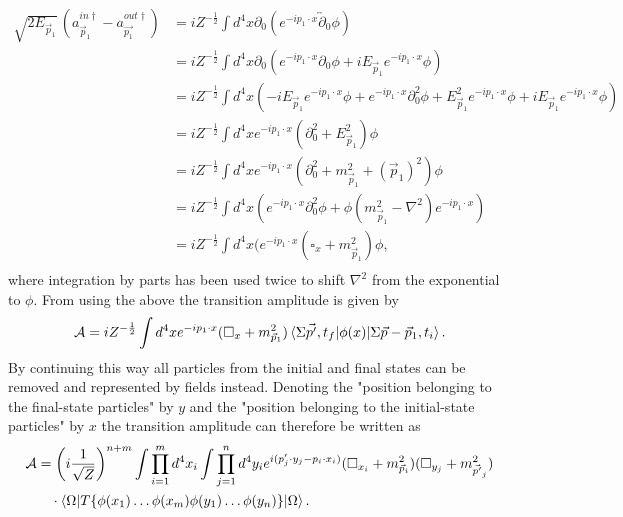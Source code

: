  \begin{equation}
	\begin{split}
		\sqrt{2E_{\vec{p}_1}}\,(a_{\vec{p}_1}^{in \dagger}-a_{\vec{p_1}}^{out\dagger})&=iZ^{-\frac{1}{2}}\int d^4x \partial_0(e^{-ip_1\cdot x}\overleftrightarrow{\partial}_0\phi)\\
		&=iZ^{-\frac{1}{2}}\int d^4x \partial_0(e^{-ip_1\cdot x}\partial_0\phi+iE_{\vec{p}_1}e^{-ip_1\cdot x}\phi)\\
		&=iZ^{-\frac{1}{2}}\int d^4x (-iE_{\vec{p}_1}e^{-ip_1\cdot x}\phi+e^{-ip_1\cdot x}\partial_0^2\phi+E_{\vec{p}_1}^2e^{-ip_1\cdot x}\phi+iE_{\vec{p}_1}e^{-ip_1\cdot x}\phi) \\
		&=iZ^{-\frac{1}{2}}\int d^4x e^{-ip_1\cdot x}(\partial_0^2+E_{\vec{p}_1}^2)\phi \\
		&=iZ^{-\frac{1}{2}}\int d^4x e^{-ip_1\cdot x}(\partial_0^2+m_{\vec{p}_1}^2+(\vec{p}_1)^2)\phi \\
		&=iZ^{-\frac{1}{2}}\int d^4x (e^{-ip_1\cdot x}\partial_0^2\phi+\phi(m_{\vec{p}_1}^2-\nabla^2)e^{-ip_1\cdot x})\\
		&=iZ^{-\frac{1}{2}}\int d^4x (e^{-ip_1\cdot x}(\square_x+m_{\vec{p}_1}^2)\phi,\\
	\end{split}
\end{equation} 
where integration by parts has been used twice to shift $\nabla^2$ from the exponential to $\phi$. From using the above the transition amplitude is given by
\begin{equation}
	\mathcal{A}=iZ^{-\frac{1}{2}}\int d^4x e^{-ip_1\cdot x}(\square _x+m_{\vec{p}_1}^2)\braket{\Sigma\vec{p'},t_f|\phi(x)|\Sigma\vec{p}-\vec{p}_1,t_i}.
\end{equation} 
By continuing this way all particles from the initial and final states can be removed and represented by fields instead. Denoting the "position belonging to the final-state particles" by $y$ and the "position belonging to the initial-state particles" by $x$ the transition amplitude can therefore be written as
\begin{equation}
	\begin{split}
		\mathcal{A}&=\bigg(i\frac{1}{\sqrt{Z}}\bigg)^{n+m}\int\prod_{i=1}^m d^4x_i\int\prod_{j=1}^n d^4y_ie^{i(p'_j\cdot y_j-p_i\cdot x_i)}(\square _{x_i}+m_{\vec{p}_i}^2)(\square _{y_j}+m_{\vec{p'}_j}^2)\\
		&\quad\cdot\braket{\Omega|T\{\phi(x_1)\dots\phi(x_m)\phi(y_1)\dots \phi(y_n)\}|\Omega}.\\
	\end{split}
	\label{am}
\end{equation} 
